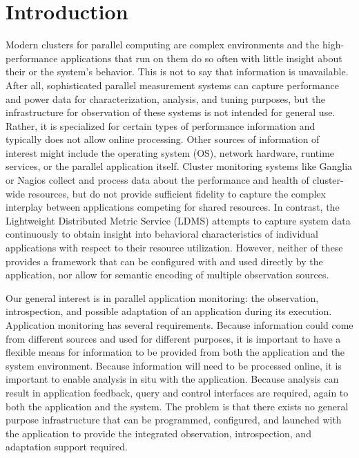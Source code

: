 
\section{Introduction}
Modern clusters for parallel computing are complex environments and
the high-performance applications that run on them do so often with
little insight about their or the system's behavior.  This is not to
say that information is unavailable.  After all, sophisticated
parallel measurement systems can capture performance and power data
for characterization, analysis, and tuning purposes, but the
infrastructure for observation of these systems is not intended for
general use.  Rather, it is specialized for certain types of
performance information and typically does not allow online
processing.  Other sources of information of interest might include
the operating system (OS), network hardware, runtime services, or the
parallel application itself.  Cluster monitoring systems like
Ganglia \cite{massie2004ganglia} or Nagios \cite{katsaros2011building}
collect and process data about the performance and health of
cluster-wide resources, but do not provide sufficient fidelity to
capture the complex interplay between applications competing for
shared resources.  In contrast, the Lightweight Distributed Metric
Service \cite{agelastos2014lightweight} (LDMS) attempts to capture
system data continuously to obtain insight into behavioral
characteristics of individual applications with respect to their
resource utilization.  However, neither of these provides a framework
that can be configured with and used directly by the application, nor
allow for semantic encoding of multiple observation sources.

Our general interest is in parallel application monitoring: the
observation, introspection, and possible adaptation of an application
during its execution.  Application monitoring has several requirements.
Because information could come from different sources and used for
different purposes, it is important to have a flexible means for
information to be provided from both the application and the system
environment.  Because information will need to be processed online, it is
important to enable analysis in situ with the application.  Because
analysis can result in application feedback, query and control interfaces
are required, again to both the application and the system.  The problem is
that there exists no general purpose infrastructure that can be programmed,
configured, and launched with the application to provide the integrated
observation, introspection, and adaptation support required.

